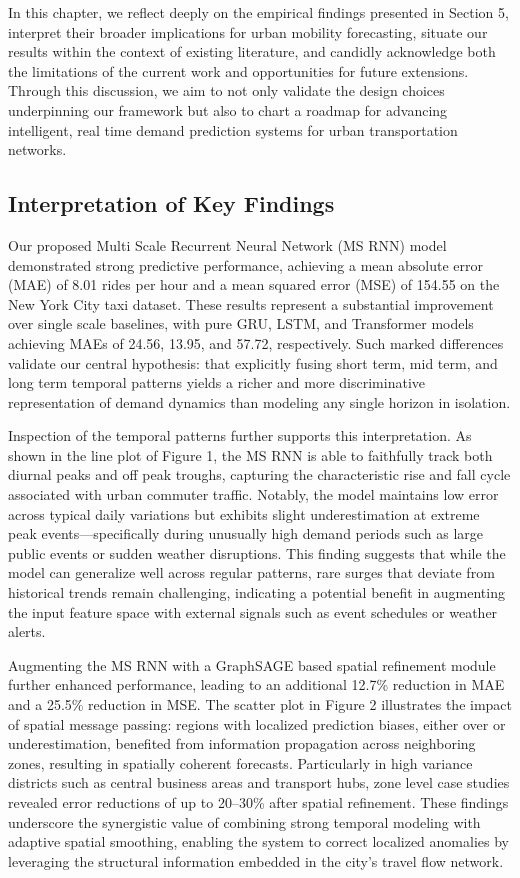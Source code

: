 \documentclass{article}
\begin{document}
In this chapter, we reflect deeply on the empirical findings presented in Section 5, interpret their broader implications for urban mobility forecasting, situate our results within the context of existing literature, and candidly acknowledge both the limitations of the current work and opportunities for future extensions. Through this discussion, we aim to not only validate the design choices underpinning our framework but also to chart a roadmap for advancing intelligent, real time demand prediction systems for urban transportation networks.

\subsection{Interpretation of Key Findings}

Our proposed Multi Scale Recurrent Neural Network (MS RNN) model demonstrated strong predictive performance, achieving a mean absolute error (MAE) of 8.01 rides per hour and a mean squared error (MSE) of 154.55 on the New York City taxi dataset. These results represent a substantial improvement over single scale baselines, with pure GRU, LSTM, and Transformer models achieving MAEs of 24.56, 13.95, and 57.72, respectively. Such marked differences validate our central hypothesis: that explicitly fusing short term, mid term, and long term temporal patterns yields a richer and more discriminative representation of demand dynamics than modeling any single horizon in isolation.

Inspection of the temporal patterns further supports this interpretation. As shown in the line plot of Figure 1, the MS RNN is able to faithfully track both diurnal peaks and off peak troughs, capturing the characteristic rise and fall cycle associated with urban commuter traffic. Notably, the model maintains low error across typical daily variations but exhibits slight underestimation at extreme peak events—specifically during unusually high demand periods such as large public events or sudden weather disruptions. This finding suggests that while the model can generalize well across regular patterns, rare surges that deviate from historical trends remain challenging, indicating a potential benefit in augmenting the input feature space with external signals such as event schedules or weather alerts.

Augmenting the MS RNN with a GraphSAGE based spatial refinement module further enhanced performance, leading to an additional 12.7\% reduction in MAE and a 25.5\% reduction in MSE. The scatter plot in Figure 2 illustrates the impact of spatial message passing: regions with localized prediction biases, either over  or underestimation, benefited from information propagation across neighboring zones, resulting in spatially coherent forecasts. Particularly in high variance districts such as central business areas and transport hubs, zone level case studies revealed error reductions of up to 20–30\% after spatial refinement. These findings underscore the synergistic value of combining strong temporal modeling with adaptive spatial smoothing, enabling the system to correct localized anomalies by leveraging the structural information embedded in the city’s travel flow network.
\end{document}
